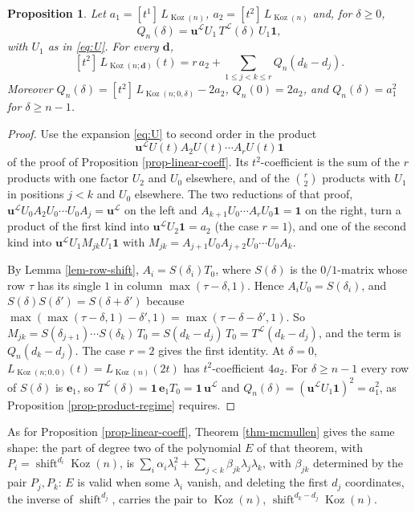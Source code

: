 \documentclass[11pt, a4paper, abstract=yes]{scrartcl}
\theoremstyle{definition}
\theoremstyle{remark}
\theoremstyle{plain}
\newtheorem{proposition}[definition]{Proposition}
\newcommand{\vek}[1]{\boldsymbol{#1}}
\theoremstyle{remark}
\theoremstyle{plain}
\newcommand{\Koz}{\operatorname{Koz}}
\newcommand{\shift}{\operatorname{shift}}
\newcommand{\leannone}{\tikz[baseline=-0.6ex]\draw[leannone,line width=0.6pt] (0,0) circle (0.55ex);}
\newcommand{\leanmark}[1]{\leavevmode{\reversemarginpar\marginnote{\raggedleft#1}}}
\begin{document}
\begin{proposition}
\leanmark{\leannone}Let \(a_1=[t^1]\,L_{\Koz(n)}\), \(a_2=[t^2]\,L_{\Koz(n)}\) and, for \(\delta\ge0\),
\begin{equation}\label{eq:Qn}
  Q_n(\delta)=\vek u^{\mathcal L}U_1\,T^{\mathcal L}(\delta)\,U_1\vek 1,
\end{equation}
with \(U_1\) as in \eqref{eq:U}. For every \(\vek d\),
\[
  [t^2]\,L_{\Koz(n;\vek d)}(t)=r\,a_2+\sum_{1\le j<k\le r}Q_n(d_k-d_j).
\]
Moreover \(Q_n(\delta)=[t^2]\,L_{\Koz(n;0,\delta)}-2a_2\), \(Q_n(0)=2a_2\), and \(Q_n(\delta)=a_1^2\) for
\(\delta\ge n-1\).
\label{prop-quadratic-coeff}
\end{proposition}

\begin{proof}
Use the expansion \eqref{eq:U} to second order in the product
\[
  \vek u^{\mathcal L}U(t)A_2U(t)\cdots A_rU(t)\vek 1
\]
of the proof of Proposition \ref{prop-linear-coeff}. Its \(t^2\)-coefficient is the sum of the \(r\)
products with one factor \(U_2\) and \(U_0\) elsewhere, and of the \(\binom r2\) products with \(U_1\)
in positions \(j<k\) and \(U_0\) elsewhere. The two reductions of that proof,
\(\vek u^{\mathcal L}U_0A_2U_0\cdots U_0A_j=\vek u^{\mathcal L}\) on the left and
\(A_{k+1}U_0\cdots A_rU_0\vek 1=\vek 1\) on the right, turn a product of the first kind into
\(\vek u^{\mathcal L}U_2\vek 1=a_2\) (the case \(r=1\)), and one of the second kind into
\(\vek u^{\mathcal L}U_1M_{jk}U_1\vek 1\) with \(M_{jk}=A_{j+1}U_0A_{j+2}U_0\cdots U_0A_k\).

By Lemma \ref{lem-row-shift}, \(A_i=S(\delta_i)T_0\), where \(S(\delta)\) is the \(0/1\)-matrix whose row
\(\tau\) has its single \(1\) in column \(\max(\tau-\delta,1)\). Hence \(A_iU_0=S(\delta_i)\), and
\(S(\delta)S(\delta')=S(\delta+\delta')\) because \(\max(\max(\tau-\delta,1)-\delta',1)=\max(\tau-\delta-\delta',1)\).
So \(M_{jk}=S(\delta_{j+1})\cdots S(\delta_k)\,T_0=S(d_k-d_j)\,T_0=T^{\mathcal L}(d_k-d_j)\), and the
term is \(Q_n(d_k-d_j)\). The case \(r=2\) gives the first identity. At \(\delta=0\),
\(L_{\Koz(n;0,0)}(t)=L_{\Koz(n)}(2t)\) has \(t^2\)-coefficient \(4a_2\). For \(\delta\ge n-1\) every row of
\(S(\delta)\) is \(\vek e_1\), so \(T^{\mathcal L}(\delta)=\vek 1\,\vek e_1T_0=\vek 1\,\vek u^{\mathcal L}\)
and \(Q_n(\delta)=(\vek u^{\mathcal L}U_1\vek 1)^2=a_1^2\), as Proposition \ref{prop-product-regime}
requires.
\end{proof}

As for Proposition \ref{prop-linear-coeff}, Theorem \ref{thm-mcmullen} gives the same shape: the part of degree
two of the polynomial \(E\) of that theorem, with \(P_i=\shift^{d_i}\Koz(n)\), is
\(\sum_i\alpha_i\lambda_i^2+\sum_{j<k}\beta_{jk}\lambda_j\lambda_k\), with \(\beta_{jk}\) determined by the
pair \(P_j,P_k\): \(E\) is valid when some \(\lambda_i\) vanish, and deleting the first
\(d_j\) coordinates, the inverse of \(\shift^{d_j}\), carries the pair to \(\Koz(n)\),
\(\shift^{d_k-d_j}\Koz(n)\).
\end{document}
